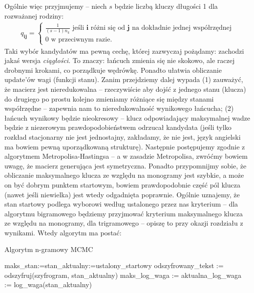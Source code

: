 \documentclass[a4paper]{article}
\theoremstyle{defn}
\theoremstyle{theorem}
\theoremstyle{lemma}
\theoremstyle{cor}
\theoremstyle{fact}
\begin{document}
Ogólnie więc przyjmujemy – niech $s$ będzie liczbą kluczy długości 1 dla rozważanej rodziny:\\
\begin{align*}
q_{\boldsymbol{ij}} = \begin{cases}
  \frac{1}{(s-1)n_k} \,\, \text{jeśli $\boldsymbol{i}$ różni się od $\boldsymbol{j}$ na dokładnie jednej współrzędnej} \\
  0 \,\, \text{w przeciwnym razie.}
\end{cases}
\end{align*}
Taki wybór kandydatów ma pewną cechę, której zazwyczaj pożądamy: zachodzi jakaś wersja \textit{ciągłości}. To znaczy: łańcuch zmienia się nie skokowo, ale raczej drobnymi krokami, co porządkuje wędrówkę. Ponadto ułatwia obliczanie update'ów wagi (funkcji stanu).
Zanim przejdziemy dalej wypada (1) zauważyć, że macierz jest nieredukowalna – rzeczywiście aby dojść z jednego stanu (klucza) do drugiego po prostu kolejno zmieniamy różniące się między stanami współrzędne – zapewnia nam to nieredukowalność wynikowego łańcucha; (2) łańcuch wynikowy będzie nieokresowy – klucz odpowiadający maksymalnej wadze będzie z niezerowym prawdopodobieństwem odrzucał kandydata (jeśli tylko rozkład stacjonarny nie jest jednostajny, zakładamy, że nie jest, język angielski ma bowiem pewną uporządkowaną strukturę).
Następnie postępujemy zgodnie z algorytmem Metropolisa-Hastingsa – a w zasadzie Metropolisa, zwróćmy bowiem uwagę, że macierz generująca jest symetryczna. Ponadto przypomnijmy sobie, że obliczanie maksymalnego klucza ze względu na monogramy jest szybkie, a może on być dobrym punktem startowym, bowiem prawdopodobnie część pól klucza (nawet jeśli niewielka) jest wtedy odgadnięta poprawnie. Ogólnie uznajemy, że stan startowy podlega wyborowi według ustalonego przez nas kryterium – dla algorytmu bigramowego będziemy przyjmować kryterium maksymalnego klucza ze względu na monogramy, dla trigramowego – opiszę to przy okazji rozdziału z wynikami. Wtedy algorytm ma postać:\\
\begin{algorithm}[H]
\caption{Algorytm n-gramowy MCMC}
maks\_stan:=stan\_aktualny:=ustalony\_startowy\;
odszyfrowany\_tekst := odszyfruj(szyfrogram, stan\_aktualny)\;
maks\_log\_waga := aktualna\_log\_waga := log\_waga(stan\_aktualny)\;
\end{algorithm}
\end{document}
